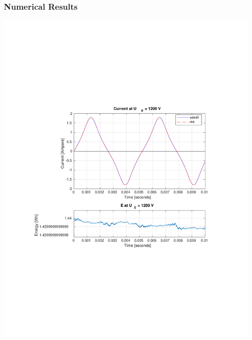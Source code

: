 \documentclass[aspectratio=1610]{beamer}
\begin{document}
\begin{frame}
	\frametitle{Numerical Results}
		\centerline{\vspace*{1cm}\includegraphics[scale=0.5]{figs/1200V + E.pdf}}
\end{frame}
\end{document}
